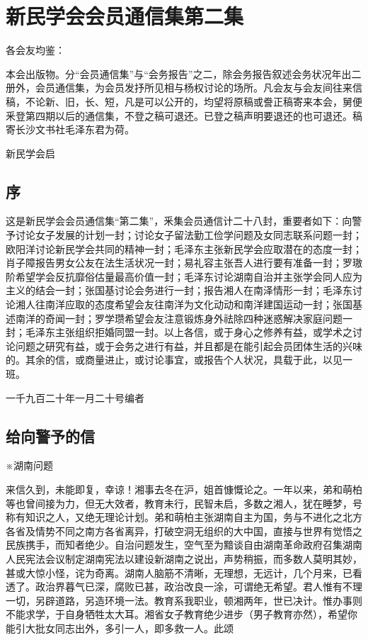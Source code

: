 \section{新民学会会员通信集第二集}



各会友均鉴：

本会出版物。分“会员通信集”与“会务报告”之二，除会务报告叙述会务状况年出二册外，会员通信集，为会员发抒所见相与杨权讨论的场所。凡会友与会友间往来信稿，不论新、旧，长、短，凡是可以公开的，均望将原稿或誊正稿寄来本会，舅便釆登第四期以后的通信集，不登之稿可退还。已登之稿声明要退还的也可退还。稿寄长沙文书社毛泽东君为荷。

\begin{flushright}新民学会启\end{flushright}
\subsection{序}

这是新民学会会员通信集“第二集”，釆集会员通信计二十八封，重要者如下：向警予讨论女子发展的计划一封；讨论女子留法勤工俭学问题及女同志联系问题一封；欧阳洋讨论新民学会共同的精神一封；毛泽东主张新民学会应取潜在的态度一封；肖子障报告男女公友在法生活状况一封；易礼容主张吾人进行要有准备一封；罗璈阶希望学会反抗靡俗估量最高价值一封；毛泽东讨论湖南自治并主张学会同人应为主义的结会一封；张国基讨论会务进行一封；报告湘人在南泽情形一封；毛泽东讨论湘人往南洋应取的态度希望会友往南洋为文化动动和南洋建国运动一封；张国基述南洋的奇闻一封；罗学瓒希望会友注意锻炼身外祛除四种迷惑解决家庭问题一封；毛泽东主张组织拒婚同盟一封。以上各信，或于身心之修养有益，或学术之讨论问题之研究有益，或于会务之进行有益，并且都是在能引起会员团体生活的兴味的。其余的信，或商量进止，或讨论事宜，或报告个人状况，具载于此，以见一班。

\begin{flushright}一千九百二十年一月二十号编者\end{flushright}
\subsection{给向警予的信}

※湖南问题

来信久到，未能即复，幸谅！湘事去冬在沪，姐首慷慨论之。一年以来，弟和萌柏等也曾间接为力，但无大效者，教育未行，民智未启，多数之湘人，犹在睡梦，号称有知识之人，又绝无理论计划。弟和萌柏主张湖南自主为国，务与不进化之北方各省及情势不同之南方各省离异，打破空洞无组织的大中国，直接与世界有觉悟之民族携手，而知者绝少。自治问题发生，空气至为黯谈自由湖南革命政府召集湖南人民宪法会议制定湖南宪法以建设新湖南之说出，声势稍振，而多数人莫明其妙，甚或大惊小怪，诧为奇离。湖南人脑筋不清晰，无理想，无远计，几个月来，已看透了。政治界暮气已深，腐败已甚，政治改良一涂，可谓绝无希望。君人惟有不理一切，另辟道路，另造环境一法。教育系我职业，顿湘两年，世已决计。惟办事则不能求学，于自身牺牲太大耳。湘省女子教育绝少进步（男子教育亦然），希望你能引大批女同志出外，多引一人，即多救一人。此颂

